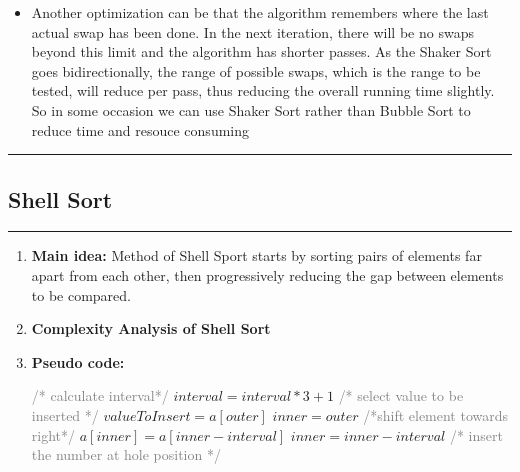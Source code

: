 \documentclass[11pt,a4paper]{article}
\begin{document}
{\begin{enumerate}[label=\textbf{\arabic*})]
\begin{itemize}
						\item Another optimization can be that the algorithm remembers where the last actual swap has been done. In the next iteration, there will be no swaps beyond this limit and the algorithm has shorter passes. As the Shaker Sort goes bidirectionally, the range of possible swaps, which is the range to be tested, will reduce per pass, thus reducing the overall running time slightly. So in some occasion we can use Shaker Sort rather than Bubble Sort to reduce time and resouce consuming
					\end{itemize}
			\end{enumerate}
		
		\rule{15cm}{0.1cm}
		\subsection{Shell Sort}
		\rule{15cm}{0.1cm}
			\begin{enumerate}[label=\textbf{\arabic*})]
				\item \textbf{Main idea:}
				Method of Shell Sport starts by sorting pairs of elements far apart from each other, then progressively reducing the gap between elements to be compared.
				\\[12pt]
				\item \textbf{Complexity Analysis of Shell Sort}
				\\[12pt]
				\item \textbf{Pseudo code:} 
				\begin{algorithm}
            	\begin{algorithmic}[1]
            			\State \textcolor{Gray}{/* calculate interval*/}
            				\State $interval = interval*3+1$ 
            			\EndWhile
            					\State \textcolor{Gray}{/* select value to be inserted */}
            					\State $valueToInsert = a[outer]$
            					\State $inner = outer$
            					\State \textcolor{Gray}{/*shift element towards right*/}
            					\vspace{12pt}
            						\State $a[inner] = a[inner-interval]$
            						\State $inner = inner - interval$
            					\EndWhile
            					\vspace{12pt}
            					\State \textcolor{Gray}{/* insert the number at hole position */}

\end{algorithmic}
\end{algorithm}
\end{enumerate}}
\end{document}

